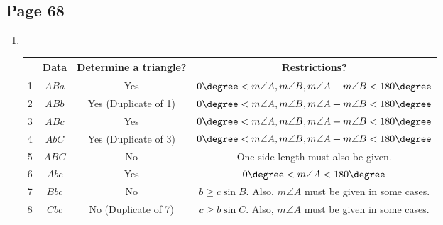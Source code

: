 \documentclass{article}
\newenvironment{solutions}[1]
{\subsection*{#1}
 \begin{enumerate}[leftmargin=1.5em]}
{\end{enumerate}}
\newcommand{\solution}{\item}
\begin{document}
\begin{solutions}{Page 68}
\solution ~ %
\begin{center}
\bgroup
\def\arraystretch{1.3}
\setlength\tabcolsep{10pt}
\begin{tabular}{ |c|c|c|c| }
\hline
& Data
& Determine a triangle?
& Restrictions? \\
\hline
1 & $ABa$ & Yes & $0\degree < m\angle{A}, m\angle{B}, m\angle{A} + m\angle{B} < 180\degree$ \\
\hline
2 & $ABb$  & Yes (Duplicate of 1) & $0\degree < m\angle{A}, m\angle{B}, m\angle{A} + m\angle{B} < 180\degree$ \\
\hline
3 & $ABc$ & Yes & $0\degree < m\angle{A}, m\angle{B}, m\angle{A} + m\angle{B} < 180\degree$ \\
\hline
4 & $AbC$ & Yes (Duplicate of 3) & $0\degree < m\angle{A}, m\angle{B}, m\angle{A} + m\angle{B} < 180\degree$ \\
\hline
5 & $ABC$ & No & One side length must also be given. \\
\hline
6 & $Abc$ & Yes & $0\degree < m\angle{A} < 180\degree$ \\
\hline
7 & $Bbc$ & No & $b \geq c\sin{B}$. Also, $m\angle{A}$ must be given in some cases. \\
\hline
8 & $Cbc$ & No (Duplicate of 7) & $c \geq b\sin{C}$. Also, $m\angle{A}$ must be given in some cases. \\
\hline
\end{tabular}
\egroup
\end{center}
\end{solutions}
\end{document}

